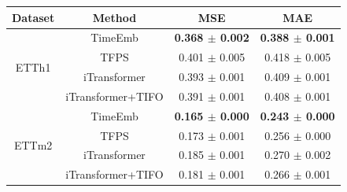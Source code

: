 {\color{blue}
\begin{tabular}{cc|cc}
\toprule
Dataset & Method & MSE & MAE \\
\midrule
\multirow{4}{*}{ETTh1} & TimeEmb & \textbf{0.368 {\small $\pm$ 0.002}} & \textbf{0.388 {\small $\pm$ 0.001}} \\
 & TFPS & 0.401 {\small $\pm$ 0.005} & 0.418 {\small $\pm$ 0.005} \\
 & iTransformer & 0.393 {\small $\pm$ 0.001} & 0.409 {\small $\pm$ 0.001} \\
 & iTransformer+TIFO & 0.391 {\small $\pm$ 0.001} & 0.408 {\small $\pm$ 0.001} \\
\midrule
\multirow{4}{*}{ETTm2} & TimeEmb & \textbf{0.165 {\small $\pm$ 0.000}} & \textbf{0.243 {\small $\pm$ 0.000}} \\
 & TFPS & 0.173 {\small $\pm$ 0.001} & 0.256 {\small $\pm$ 0.000} \\
 & iTransformer & 0.185 {\small $\pm$ 0.001} & 0.270 {\small $\pm$ 0.002} \\
 & iTransformer+TIFO & 0.181 {\small $\pm$ 0.001} & 0.266 {\small $\pm$ 0.001} \\
\bottomrule
\end{tabular}
}
